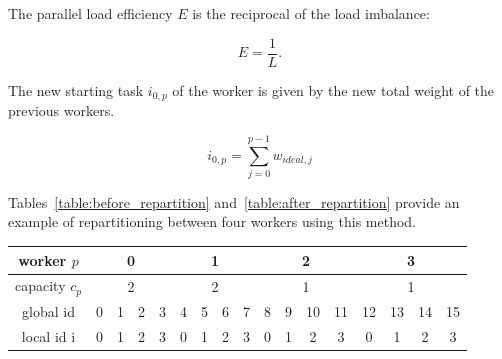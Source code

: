 \noindent
The parallel load efficiency \(E\) is the reciprocal of the load imbalance:

\begin{equation}
    E = \frac{1}{L}.
\end{equation}

The new starting task \(i_{0, p}\) of the worker is given by the new total weight of the previous
workers.

\begin{equation}
    i_{0, p} = \sum_{j = 0}^{p - 1}w_{ideal,j}
\end{equation}

Tables~\ref{table:before_repartition} and~\ref{table:after_repartition} provide an example of
repartitioning between four workers using this method.

\begin{table}[H]
    \begin{center}
        \begin{tabular}{ | c | c | c | c | c | c | c | c | c | c | c | c | c | c | c | c | c | } 
            \hline
            worker \(p\) & \multicolumn{4}{c|}{\cellcolor{vs_lightgreen}0} & \multicolumn{4}{c|}{\cellcolor{vs_lightblue}1} & \multicolumn{4}{c|}{\cellcolor{vs_lightred}2} & \multicolumn{4}{c|}{\cellcolor{vs_lightplum}3}  \\
            \hline
            capacity \(c_p\) & \multicolumn{4}{c|}{\cellcolor{vs_lightgreen}2} & \multicolumn{4}{c|}{\cellcolor{vs_lightblue}2} & \multicolumn{4}{c|}{\cellcolor{vs_lightred}1} & \multicolumn{4}{c|}{\cellcolor{vs_lightplum}1}  \\
            \hline
            global id & \cellcolor{vs_lightgreen}0 & \cellcolor{vs_lightgreen}1 & \cellcolor{vs_lightgreen}2 & \cellcolor{vs_lightgreen}3 & \cellcolor{vs_lightblue}4 & \cellcolor{vs_lightblue}5 & \cellcolor{vs_lightblue}6 & \cellcolor{vs_lightblue}7 & \cellcolor{vs_lightred}8 & \cellcolor{vs_lightred}9 & \cellcolor{vs_lightred}10 & \cellcolor{vs_lightred}11 & \cellcolor{vs_lightplum}12 & \cellcolor{vs_lightplum}13 & \cellcolor{vs_lightplum}14 & \cellcolor{vs_lightplum}15 \\ 
            \hline
            local id i & \cellcolor{vs_lightgreen}0 & \cellcolor{vs_lightgreen}1 & \cellcolor{vs_lightgreen}2 & \cellcolor{vs_lightgreen}3 & \cellcolor{vs_lightblue}0 & \cellcolor{vs_lightblue}1 & \cellcolor{vs_lightblue}2 & \cellcolor{vs_lightblue}3 & \cellcolor{vs_lightred}0 & \cellcolor{vs_lightred}1 & \cellcolor{vs_lightred}2 & \cellcolor{vs_lightred}3 & \cellcolor{vs_lightplum}0 & \cellcolor{vs_lightplum}1 & \cellcolor{vs_lightplum}2 & \cellcolor{vs_lightplum}3 \\ 

\end{tabular}
\end{center}
\end{table}
